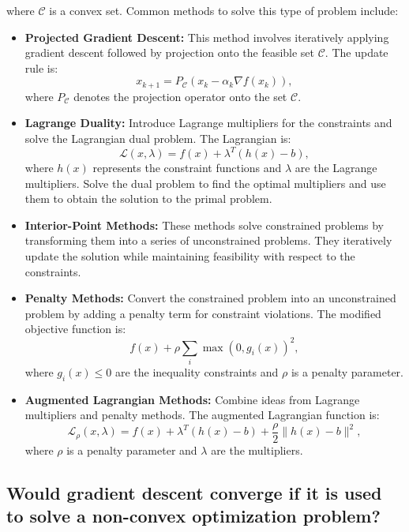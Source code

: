where \( \mathcal{C} \) is a convex set. Common methods to solve this type of problem include:

\begin{itemize}
  \item \textbf{Projected Gradient Descent:} This method involves iteratively applying gradient descent followed by projection onto the feasible set \( \mathcal{C} \). The update rule is:
  \[
  x_{k+1} = P_{\mathcal{C}}\left(x_k - \alpha_k \nabla f(x_k)\right),
  \]
  where \( P_{\mathcal{C}} \) denotes the projection operator onto the set \( \mathcal{C} \).

  \item \textbf{Lagrange Duality:} Introduce Lagrange multipliers for the constraints and solve the Lagrangian dual problem. The Lagrangian is:
  \[
  \mathcal{L}(x, \lambda) = f(x) + \lambda^T (h(x) - b),
  \]
  where \( h(x) \) represents the constraint functions and \( \lambda \) are the Lagrange multipliers. Solve the dual problem to find the optimal multipliers and use them to obtain the solution to the primal problem.

  \item \textbf{Interior-Point Methods:} These methods solve constrained problems by transforming them into a series of unconstrained problems. They iteratively update the solution while maintaining feasibility with respect to the constraints.

  \item \textbf{Penalty Methods:} Convert the constrained problem into an unconstrained problem by adding a penalty term for constraint violations. The modified objective function is:
  \[
  f(x) + \rho \sum_{i} \max(0, g_i(x))^2,
  \]
  where \( g_i(x) \leq 0 \) are the inequality constraints and \( \rho \) is a penalty parameter.

  \item \textbf{Augmented Lagrangian Methods:} Combine ideas from Lagrange multipliers and penalty methods. The augmented Lagrangian function is:
  \[
  \mathcal{L}_\rho(x, \lambda) = f(x) + \lambda^T (h(x) - b) + \frac{\rho}{2} \|h(x) - b\|^2,
  \]
  where \( \rho \) is a penalty parameter and \( \lambda \) are the multipliers.
\end{itemize}


\subsection{Would gradient descent converge if it is used to solve a non-convex optimization
problem?}

